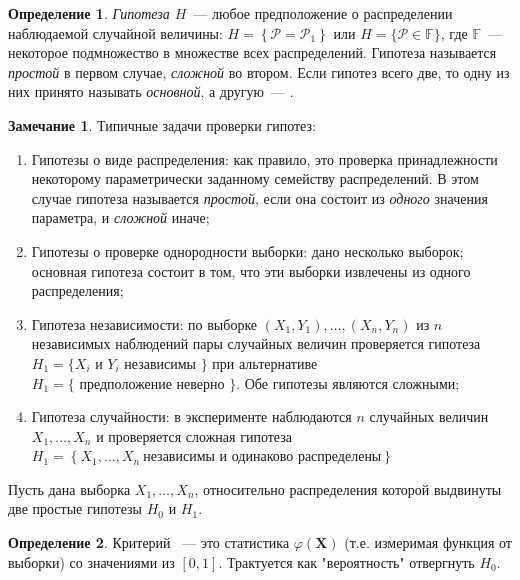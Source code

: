 \documentclass[oneside,final,14pt]{extreport}
\theoremstyle{plain}
\theoremstyle{definition}
\newtheorem*{defn}{Определение}
\newtheorem*{rmrk}{Замечание}
\theoremstyle{named}
\begin{document}
\begin{defn}
{\it Гипотеза $H$}~--- любое предположение о распределении наблюдаемой случайной величины: $H=\left\{\mathcal{P}=\mathcal{P}_{1}\right\}$ или $H=\{\mathcal{P} \in \mathbb{F}\}$, где $\mathbb{F}$~--- некоторое подмножество в множестве всех распределений. Гипотеза называется {\it простой} в первом случае, {\it сложной} во втором. Если гипотез всего две, то одну из них принято называть {\it основной}, а другую~--- {}.
\end{defn}

\begin{rmrk} Типичные задачи проверки гипотез:
\begin{enumerate}
    \item Гипотезы о виде распределения: как правило, это проверка принадлежности некоторому параметрически заданному семейству распределений. В этом случае гипотеза называется {\it простой}, если она состоит из {\it одного} значения параметра, и {\it сложной} иначе;
    \item Гипотезы о проверке однородности выборки: дано несколько выборок; основная гипотеза состоит в том, что эти выборки извлечены из одного распределения;
    \item Гипотеза независимости: по выборке $(X_1,Y_1), \ldots, (X_n,Y_n)$ из $n$ независимых наблюдений пары случайных величин проверяется гипотеза $H_{1}=\{X_{i} \text { и } Y_{i} \text { независимы }\}$ при альтернативе $H_{1}=\{ \text { предположение неверно } \}$. Обе гипотезы являются сложными;
    \item Гипотеза случайности: в эксперименте наблюдаются $n$ случайных величин $X_{1}, \ldots, X_{n}$ и проверяется сложная гипотеза $H_{1}=\left\{X_{1}, \ldots, X_{n}~ \text{независимы и одинаково распределены}\right\}$
\end{enumerate}
\end{rmrk}

Пусть дана выборка $X_{1}, \ldots, X_{n}$, относительно распределения которой выдвинуты две простые гипотезы $H_{0}$ и $H_1$.
\begin{defn}
    Критерий ~--- это статистика $\varphi(\mathbf{X})$ (т.е. измеримая функция от выборки) со значениями из $[0, 1]$. Трактуется как "вероятность" отвергнуть $H_0$.
\end{defn}

\end{document}
